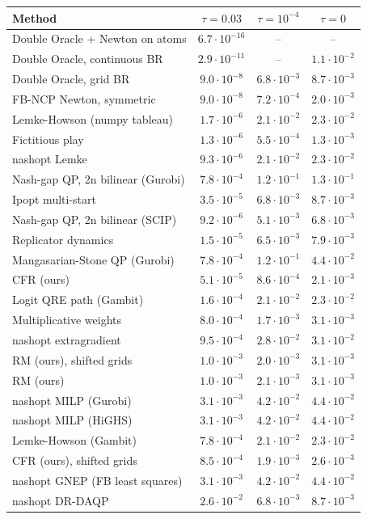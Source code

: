 \begin{tabular}{lccc}
\toprule
Method & $\tau=0.03$ & $\tau=10^{-4}$ & $\tau=0$ \\
\midrule
Double Oracle + Newton on atoms & $6.7\cdot10^{-16}$ & -- & -- \\
Double Oracle, continuous BR & $2.9\cdot10^{-11}$ & -- & $1.1\cdot10^{-2}$ \\
Double Oracle, grid BR & $9.0\cdot10^{-8}$ & $6.8\cdot10^{-3}$ & $8.7\cdot10^{-3}$ \\
FB-NCP Newton, symmetric & $9.0\cdot10^{-8}$ & $7.2\cdot10^{-4}$ & $2.0\cdot10^{-3}$ \\
Lemke-Howson (numpy tableau) & $1.7\cdot10^{-6}$ & $2.1\cdot10^{-2}$ & $2.3\cdot10^{-2}$ \\
Fictitious play & $1.3\cdot10^{-6}$ & $5.5\cdot10^{-4}$ & $1.3\cdot10^{-3}$ \\
nashopt Lemke & $9.3\cdot10^{-6}$ & $2.1\cdot10^{-2}$ & $2.3\cdot10^{-2}$ \\
Nash-gap QP, 2n bilinear (Gurobi) & $7.8\cdot10^{-4}$ & $1.2\cdot10^{-1}$ & $1.3\cdot10^{-1}$ \\
Ipopt multi-start & $3.5\cdot10^{-5}$ & $6.8\cdot10^{-3}$ & $8.7\cdot10^{-3}$ \\
Nash-gap QP, 2n bilinear (SCIP) & $9.2\cdot10^{-6}$ & $5.1\cdot10^{-3}$ & $6.8\cdot10^{-3}$ \\
Replicator dynamics & $1.5\cdot10^{-5}$ & $6.5\cdot10^{-3}$ & $7.9\cdot10^{-3}$ \\
Mangasarian-Stone QP (Gurobi) & $7.8\cdot10^{-4}$ & $1.2\cdot10^{-1}$ & $4.4\cdot10^{-2}$ \\
CFR (ours) & $5.1\cdot10^{-5}$ & $8.6\cdot10^{-4}$ & $2.1\cdot10^{-3}$ \\
Logit QRE path (Gambit) & $1.6\cdot10^{-4}$ & $2.1\cdot10^{-2}$ & $2.3\cdot10^{-2}$ \\
Multiplicative weights & $8.0\cdot10^{-4}$ & $1.7\cdot10^{-3}$ & $3.1\cdot10^{-3}$ \\
nashopt extragradient & $9.5\cdot10^{-4}$ & $2.8\cdot10^{-2}$ & $3.1\cdot10^{-2}$ \\
RM (ours), shifted grids & $1.0\cdot10^{-3}$ & $2.0\cdot10^{-3}$ & $3.1\cdot10^{-3}$ \\
RM (ours) & $1.0\cdot10^{-3}$ & $2.1\cdot10^{-3}$ & $3.1\cdot10^{-3}$ \\
nashopt MILP (Gurobi) & $3.1\cdot10^{-3}$ & $4.2\cdot10^{-2}$ & $4.4\cdot10^{-2}$ \\
nashopt MILP (HiGHS) & $3.1\cdot10^{-3}$ & $4.2\cdot10^{-2}$ & $4.4\cdot10^{-2}$ \\
Lemke-Howson (Gambit) & $7.8\cdot10^{-4}$ & $2.1\cdot10^{-2}$ & $2.3\cdot10^{-2}$ \\
CFR (ours), shifted grids & $8.5\cdot10^{-4}$ & $1.9\cdot10^{-3}$ & $2.6\cdot10^{-3}$ \\
nashopt GNEP (FB least squares) & $3.1\cdot10^{-3}$ & $4.2\cdot10^{-2}$ & $4.4\cdot10^{-2}$ \\
nashopt DR-DAQP & $2.6\cdot10^{-2}$ & $6.8\cdot10^{-3}$ & $8.7\cdot10^{-3}$ \\
\bottomrule
\end{tabular}
